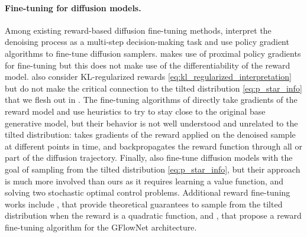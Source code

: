 \documentclass[]{fairmeta}
\begin{document}
\paragraph{Fine-tuning for diffusion models.}
Among existing reward-based diffusion fine-tuning methods, \citet{fan2023optimizing} interpret the denoising process as a multi-step decision-making task and use policy gradient algorithms to fine-tune diffusion samplers. 
\citet{black2024training} makes use of proximal policy gradients for fine-tuning but this does not make use of the differentiability of the reward model. 
\citet{fan2023dpok} also consider KL-regularized rewards \eqref{eq:kl_regularized_interpretation} but do not make the critical connection to the tilted distribution \eqref{eq:p_star_info} that we flesh out in . 
The fine-tuning algorithms of \cite{xu2023imagereward,clark2024directly} directly take gradients of the reward model and use heuristics to try to stay close to the original base generative model, but their behavior is not well understood and unrelated to the tilted distribution: \cite{xu2023imagereward} takes gradients of the reward applied on the denoised sample at different points in time, and \cite{clark2024directly} backpropagates the reward function through all or part of the diffusion trajectory. 
Finally, \cite{uehara2024finetuning} also fine-tune diffusion models with the goal of sampling from the tilted distribution \eqref{eq:p_star_info}, but their approach is much more involved than ours as it requires learning a value function, and solving two stochastic optimal control problems. Additional reward fine-tuning works include \cite{bruna2024posterior}, that provide theoretical guarantees to sample from the tilted distribution when the reward is a quadratic function, and \cite{zhang2024improving}, that propose a reward fine-tuning algorithm for the GFlowNet architecture. 
\end{document}
